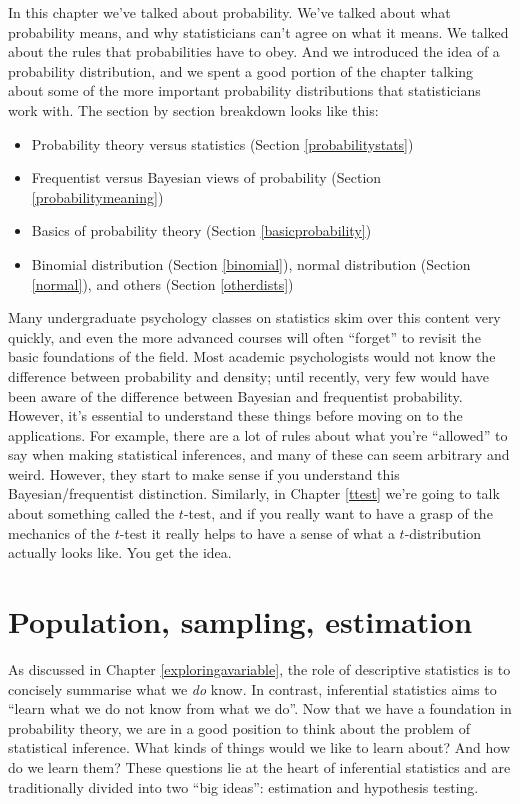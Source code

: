 \documentclass[
]{book}
\providecommand{\tightlist}{%
  \setlength{\itemsep}{0pt}\setlength{\parskip}{0pt}}
\theoremstyle{definition}
\theoremstyle{definition}
\theoremstyle{definition}
\theoremstyle{definition}
\theoremstyle{remark}
\begin{document}
In this chapter we've talked about probability. We've talked about what probability means, and why statisticians can't agree on what it means. We talked about the rules that probabilities have to obey. And we introduced the idea of a probability distribution, and we spent a good portion of the chapter talking about some of the more important probability distributions that statisticians work with. The section by section breakdown looks like this:

\begin{itemize}
\tightlist
\item
  Probability theory versus statistics (Section \ref{probabilitystats})
\item
  Frequentist versus Bayesian views of probability (Section \ref{probabilitymeaning})
\item
  Basics of probability theory (Section \ref{basicprobability})
\item
  Binomial distribution (Section \ref{binomial}), normal distribution (Section \ref{normal}), and others (Section \ref{otherdists})
\end{itemize}

Many undergraduate psychology classes on statistics skim over this content very quickly, and even the more advanced courses will often ``forget'' to revisit the basic foundations of the field. Most academic psychologists would not know the difference between probability and density; until recently, very few would have been aware of the difference between Bayesian and frequentist probability. However, it's essential to understand these things before moving on to the applications. For example, there are a lot of rules about what you're ``allowed'' to say when making statistical inferences, and many of these can seem arbitrary and weird. However, they start to make sense if you understand this Bayesian/frequentist distinction. Similarly, in Chapter \ref{ttest} we're going to talk about something called the \(t\)-test, and if you really want to have a grasp of the mechanics of the \(t\)-test it really helps to have a sense of what a \(t\)-distribution actually looks like. You get the idea.

\hypertarget{estimation}{%
\chapter{Population, sampling, estimation}\label{estimation}}

As discussed in Chapter \ref{exploringavariable}, the role of descriptive statistics is to concisely summarise what we \emph{do} know. In contrast, inferential statistics aims to ``learn what we do not know from what we do''. Now that we have a foundation in probability theory, we are in a good position to think about the problem of statistical inference. What kinds of things would we like to learn about? And how do we learn them? These questions lie at the heart of inferential statistics and are traditionally divided into two ``big ideas'': estimation and hypothesis testing.
\end{document}
